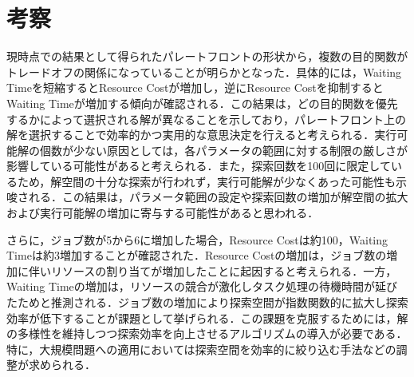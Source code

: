 \section{考察}
現時点での結果として得られたパレートフロントの形状から，複数の目的関数がトレードオフの関係になっていることが明らかとなった．具体的には，Waiting Timeを短縮するとResource Costが増加し，逆にResource Costを抑制するとWaiting Timeが増加する傾向が確認される．この結果は，どの目的関数を優先するかによって選択される解が異なることを示しており，パレートフロント上の解を選択することで効率的かつ実用的な意思決定を行えると考えられる．実行可能解の個数が少ない原因としては，各パラメータの範囲に対する制限の厳しさが影響している可能性があると考えられる．また，探索回数を100回に限定しているため，解空間の十分な探索が行われず，実行可能解が少なくあった可能性も示唆される．この結果は，パラメータ範囲の設定や探索回数の増加が解空間の拡大および実行可能解の増加に寄与する可能性があると思われる．

さらに，ジョブ数が5から6に増加した場合，Resource Costは約100，Waiting Timeは約3増加することが確認された．Resource Costの増加は，ジョブ数の増加に伴いリソースの割り当てが増加したことに起因すると考えられる．一方，Waiting Timeの増加は，リソースの競合が激化しタスク処理の待機時間が延びたためと推測される．ジョブ数の増加により探索空間が指数関数的に拡大し探索効率が低下することが課題として挙げられる．この課題を克服するためには，解の多様性を維持しつつ探索効率を向上させるアルゴリズムの導入が必要である．特に，大規模問題への適用においては探索空間を効率的に絞り込む手法などの調整が求められる．
